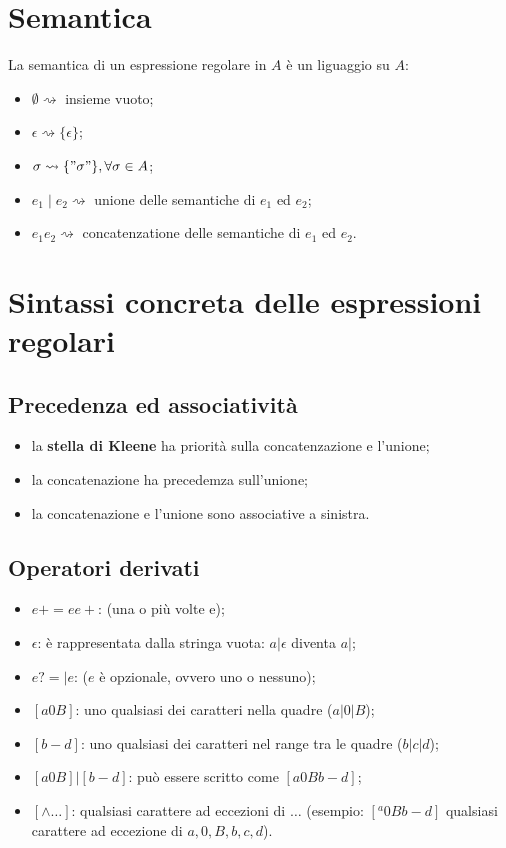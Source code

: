 \section{Semantica}
La semantica di un espressione regolare in $A$ è un liguaggio su $A$:
\begin{itemize}
  \item $\emptyset \rightsquigarrow$ insieme vuoto;
  \item $\epsilon \rightsquigarrow \{\epsilon\}$;
  \item $\sigma \rightsquigarrow \{"\sigma"\},\forall\sigma\in A$;
  \item $e_1\mid e_2\rightsquigarrow$ unione delle semantiche di $e_1$ ed
    $e_2$;
  \item $e_1 e_2\rightsquigarrow$ concatenzatione delle semantiche di $e_1$
    ed $e_2$.
\end{itemize}

\section{Sintassi concreta delle espressioni regolari}
\subsection{Precedenza ed associatività}
\begin{itemize}
  \item la \textbf{stella di Kleene} ha priorità sulla concatenzazione e
    l'unione;
  \item la concatenazione ha precedemza sull'unione;
  \item la concatenazione e l'unione sono associative a sinistra.
\end{itemize}

\subsection{Operatori derivati}
\begin{itemize}
  \item $e+=ee+$: (una o più volte e);
  \item $\epsilon$: è rappresentata dalla stringa vuota: $a|\epsilon$ diventa
    $a|$;
  \item $e?=|e$: ($e$ è opzionale, ovvero uno o nessuno);
  \item $[a0B]$: uno qualsiasi dei caratteri nella quadre ($a|0|B$);
  \item $[b-d]$: uno qualsiasi dei caratteri nel range tra le quadre ($b|c|d$);
  \item $[a0B]|[b-d]$: può essere scritto come $[a0Bb-d]$;
  \item $[\wedge\dots]$: qualsiasi carattere ad eccezioni di $\dots$ (esempio:
    $[^a0Bb-d]$ qualsiasi carattere ad eccezione di $a,0,B,b,c,d$).
\end{itemize}

